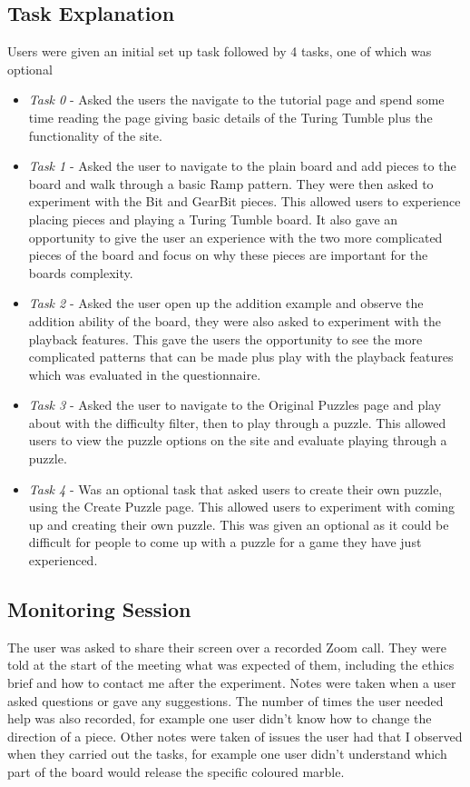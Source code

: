 \documentclass{l4proj}
\begin{document}
\subsection{Task Explanation}
\label{taskExplanation}
Users were given an initial set up task followed by 4 tasks, one of which was optional

\begin{itemize}
    \item \emph{Task 0} - Asked the users the navigate to the tutorial page and spend some time reading the page giving basic details of the Turing Tumble plus the functionality of the site.
    \item \emph{Task 1} - Asked the user to navigate to the plain board and add pieces to the board and walk through a basic Ramp pattern. They were then asked to experiment with the Bit and GearBit pieces. This allowed users to experience placing pieces and playing a Turing Tumble board. It also gave an opportunity to give the user an experience with the two more complicated pieces of the board and focus on why these pieces are important for the boards complexity.
    \item \emph{Task 2} - Asked the user open up the addition example and observe the addition ability of the board, they were also asked to experiment with the playback features. This gave the users the opportunity to see the more complicated patterns that can be made plus play with the playback features which was evaluated in the questionnaire.
    \item \emph{Task 3} - Asked the user to navigate to the Original Puzzles page and play about with the difficulty filter, then to play through a puzzle. This allowed users to view the puzzle options on the site and evaluate playing through a puzzle.
    \item \emph{Task 4} - Was an optional task that asked users to create their own puzzle, using the Create Puzzle page. This allowed users to experiment with coming up and creating their own puzzle. This was given an optional as it could be difficult for people to come up with a puzzle for a game they have just experienced.
\end{itemize}

\subsection{Monitoring Session}
The user was asked to share their screen over a recorded Zoom call. They were told at the start of the meeting what was expected of them, including the ethics brief and how to contact me after the experiment. Notes were taken when a user asked questions or gave any suggestions. The number of times the user needed help was also recorded, for example one user didn't know how to change the direction of a piece. Other notes were taken of issues the user had that I observed when they carried out the tasks, for example one user didn't understand which part of the board would release the specific coloured marble.
\end{document}
